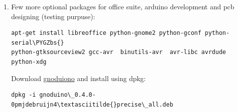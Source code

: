 \documentclass[letterpaper,10pt,english]{sphinxmanual}
\def\PYGZbs{\char`\\}
\begin{document}
\begin{enumerate}
\begin{Verbatim}[commandchars=\\\{\}]
apt-get install bash-completion lxtask htop \PYGZbs{}
python-central python-gobject-2 python-gtk2 synaptic\PYGZbs{}
\end{Verbatim}

Download \href{http://zevenos.com/files/lxproxy\_0.1ubuntu3\_all.deb}{lxproxy} and install using dpkg:

\begin{Verbatim}[commandchars=\\\{\}]
dpkg -i lxproxy\_0.1ubuntu3\_all.deb
\end{Verbatim}

\item {} 
Few more optional packages for office suite, arduino development and pcb designing (testing purpuse):

\begin{Verbatim}[commandchars=\\\{\}]
apt-get install libreoffice python-gnome2 python-gconf python-serial\PYGZbs{}
python-gtksourceview2 gcc-avr  binutils-avr  avr-libc avrdude python-xdg
\end{Verbatim}

Download  \href{https://launchpad.net/~pmjdebruijn/+archive/gnoduino-release/+files/gnoduino\_0.4.0-0pmjdebruijn4\%7Eprecise\_all.deb}{gnoduiono} and install using dpkg:

\begin{Verbatim}[commandchars=\\\{\}]
dpkg -i gnoduino\_0.4.0-0pmjdebruijn4\textasciitilde{}precise\_all.deb
\end{Verbatim}

\end{enumerate}
\end{document}
